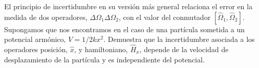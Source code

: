 \documentclass[addpoints,spanish, 12pt,a4paper]{exam}
\begin{document}
\begin{questions}
    \question[1\half] El principio de incertidumbre
    en su versión más general relaciona el error en 
    la medida de dos operadores,
    $\Delta\Omega_1\Delta\Omega_2$,
    con el valor del conmutador
    $[\hat{\Omega}_1,\hat{\Omega}_2]$. Supongamos
    que nos encontramos en el caso de una partícula
    sometida a un potencial armónico, $V=1/2kx^2$.
    Demuestra que la incertidumbre asociada a los
    operadores posición, $\hat{x}$, y hamiltoniano,
    $\hat{H}_x$, depende de la velocidad de
    desplazamiento de la partícula y es independiente
    del potencial.
    \newpage


\end{questions}
\end{document}
